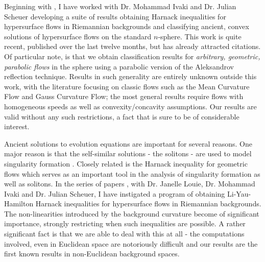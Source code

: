 \documentclass[12pt]{amsart}
\begin{document}
Beginning with \cite{bryanlouie}, I have worked with Dr. Mohammad Ivaki and Dr. Julian Scheuer \cite{BIS4,2016arXiv160401694B,2016arXiv160401694B,2015arXiv150802821B} developing a suite of results obtaining Harnack inequalities for hypersurface flows in Riemannian backgrounds and classifying ancient, convex solutions of hypersurface flows on the standard $n$-sphere. This work is quite recent, published over the last twelve months, but has already attracted citations. Of particular note, is that we obtain classification results for \emph{arbitrary, geometric, parabolic flows} in the sphere using a parabolic version of the Aleksandrov reflection technique. Results in such generality are entirely unknown outside this work, with the literature focusing on classic flows such as the Mean Curvature Flow and Gauss Curvature Flow; the most general results require flows with homogeneous speeds as well as convexity/concavity assumptions. Our results are valid without any such restrictions, a fact that is sure to be of considerable interest.

Ancient solutions to evolution equations are important for several reasons. One major reason is that the self-similar solutions - the solitons - are used to model singularity formation \cite{MR1375255,MR1666878}. Closely related is the Harnack inequality for geometric flows \cite{MR1296393,MR1316556,MR1100812,MR1198607} which serves as an important tool in the analysis of singularity formation as well as solitons. In the series of papers \cite{bryanlouie,2016arXiv160401694B,2015arXiv150802821B,2015arXiv151203374B}, with Dr. Janelle Louie, Dr. Mohammad Ivaki and Dr. Julian Scheuer, I have instigated a program of obtaining Li-Yau-Hamilton Harnack inequalities for hypersurface flows in Riemannian backgrounds. The non-linearities introduced by the background curvature become of significant importance, strongly restricting when such inequalities are possible. A rather significant fact is that we are able to deal with this at all - the computations involved, even in Euclidean space are notoriously difficult and our results are the first known results in non-Euclidean background spaces.
\end{document}
